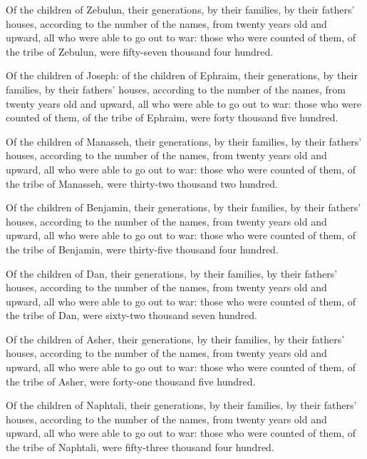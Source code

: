 \myverse{}Of the children of Zebulun, their generations, by their families,
by their fathers’ houses, according to the number of the names, from twenty years old and upward, all
who were able to go out to war:
\myverse{}those who were counted of them, of the tribe of Zebulun, were fifty-seven
thousand four hundred.


\myverse{}Of the children of Joseph: of the children of Ephraim, their
generations, by their families, by their fathers’ houses, according to the number of the names, from twenty
years old and upward, all who were able to go out to war:
\myverse{}those who were counted of them, of the tribe of Ephraim, were forty thousand
five hundred.


\myverse{}Of the children of Manasseh, their generations, by their families,
by their fathers’ houses, according to the number of the names, from twenty years old and upward, all
who were able to go out to war:
\myverse{}those who were counted of them, of the tribe of Manasseh, were thirty-two
thousand two hundred.


\myverse{}Of the children of Benjamin, their generations, by their families,
by their fathers’ houses, according to the number of the names, from twenty years old and upward, all
who were able to go out to war:
\myverse{}those who were counted of them, of the tribe of Benjamin, were thirty-five
thousand four hundred.


\myverse{}Of the children of Dan, their generations, by their families,
by their fathers’ houses, according to the number of the names, from twenty years old and upward, all
who were able to go out to war:
\myverse{}those who were counted of them, of the tribe of Dan, were sixty-two thousand
seven hundred.


\myverse{}Of the children of Asher, their generations, by their families,
by their fathers’ houses, according to the number of the names, from twenty years old and upward, all
who were able to go out to war:
\myverse{}those who were counted of them, of the tribe of Asher, were forty-one thousand
five hundred.


\myverse{}Of the children of Naphtali, their generations, by their families,
by their fathers’ houses, according to the number of the names, from twenty years old and upward, all
who were able to go out to war:
\myverse{}those who were counted of them, of the tribe of Naphtali, were fifty-three
thousand four hundred.



